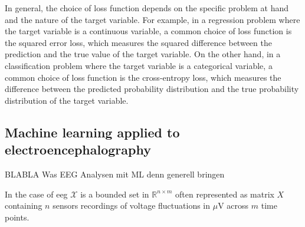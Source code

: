 In general, the choice of loss function depends on the specific problem at hand and the nature of the target variable. For example, in a regression problem where the target variable is a continuous variable, a common choice of loss function is the squared error loss, which measures the squared difference between the prediction and the true value of the target variable. On the other hand, in a classification problem where the target variable is a categorical variable, a common choice of loss function is the cross-entropy loss, which measures the difference between the predicted probability distribution and the true probability distribution of the target variable.\\


\subsection{Machine learning applied to electroencephalography}
BLABLA Was EEG Analysen mit ML denn generell bringen 

In the case of \gls{eeg} $\mathcal{X}$ is a bounded set in $\mathbb{R}^{n\times m}$ often represented as matrix $X$ containing $n$ sensors recordings of voltage fluctuations in $\mu$V across $m$ time points. 


